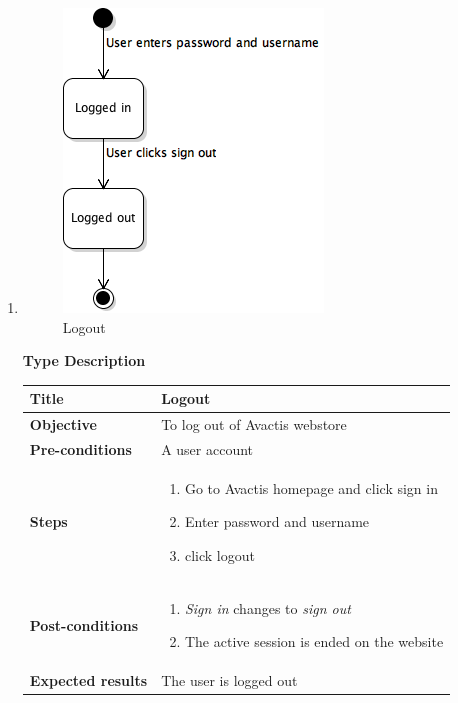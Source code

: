 \documentclass[UKenglish,12pt]{article}
\begin{document}
\begin{enumerate}
\item
\begin{figure}[H]
\centering
\includegraphics[scale=0.6,keepaspectratio]{Images/Logout.png}
\caption{Logout}
\end{figure}

\textbf{\hspace{0.3cm}Type\hspace{4.4cm} Description}
\newline \vspace{0.2cm}
\begin{tabular}{| p{5cm} | p{10cm} | }
	\hline
	 \textbf{Title} & Logout \\ \hline
	 \textbf{Objective} & To log out of Avactis webstore \\ \hline
	 \textbf{Pre-conditions} & A user account \\ \hline
	 \textbf{Steps} & \begin{enumerate} \item Go to Avactis homepage and click sign in \item Enter password and username \item click logout  \end{enumerate}\\ \hline
	 \textbf{Post-conditions} & \begin{enumerate}\item\textit{Sign in} changes to \textit{sign out} \item The active session is ended on the website \end{enumerate}  \\ \hline
	 \textbf{Expected results} & The user is logged out\\ 
	 \hline
\end{tabular} %


\end{enumerate}
\end{document}
